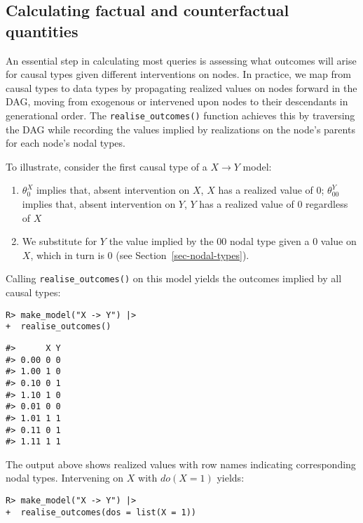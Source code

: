 \documentclass[
  11pt,
  article]{jss}
\providecommand{\tightlist}{%
  \setlength{\itemsep}{0pt}\setlength{\parskip}{0pt}}\usepackage{longtable,booktabs,array}
\begin{document}
\hypertarget{sec-propagation}{%
\subsection{Calculating factual and counterfactual
quantities}\label{sec-propagation}}

An essential step in calculating most queries is assessing what outcomes
will arise for causal types given different interventions on nodes. In
practice, we map from causal types to data types by propagating realized
values on nodes forward in the DAG, moving from exogenous or intervened
upon nodes to their descendants in generational order. The
\texttt{realise\_outcomes()} function achieves this by traversing the
DAG while recording the values implied by realizations on the node's
parents for each node's nodal types.

To illustrate, consider the first causal type of a \(X \rightarrow Y\)
model:

\begin{enumerate}
\def\labelenumi{\arabic{enumi}.}
\tightlist
\item
  \(\theta^X_0\) implies that, absent intervention on \(X\), \(X\) has a
  realized value of \(0\); \(\theta^Y_{00}\) implies that, absent
  intervention on \(Y\), \(Y\) has a realized value of \(0\) regardless
  of \(X\)
\item
  We substitute for \(Y\) the value implied by the \(00\) nodal type
  given a \(0\) value on \(X\), which in turn is \(0\) (see
  Section~\ref{sec-nodal-types}).
\end{enumerate}

Calling \texttt{realise\_outcomes()} on this model yields the outcomes
implied by all causal types:

\begin{verbatim}
R> make_model("X -> Y") |> 
+  realise_outcomes()
\end{verbatim}

\begin{verbatim}
#>      X Y
#> 0.00 0 0
#> 1.00 1 0
#> 0.10 0 1
#> 1.10 1 0
#> 0.01 0 0
#> 1.01 1 1
#> 0.11 0 1
#> 1.11 1 1
\end{verbatim}

The output above shows realized values with row names indicating
corresponding nodal types. Intervening on \(X\)
\citep[see][]{pearl_causality_2009} with \(do(X=1)\) yields:

\begin{verbatim}
R> make_model("X -> Y") |> 
+  realise_outcomes(dos = list(X = 1))
\end{verbatim}
\end{document}
